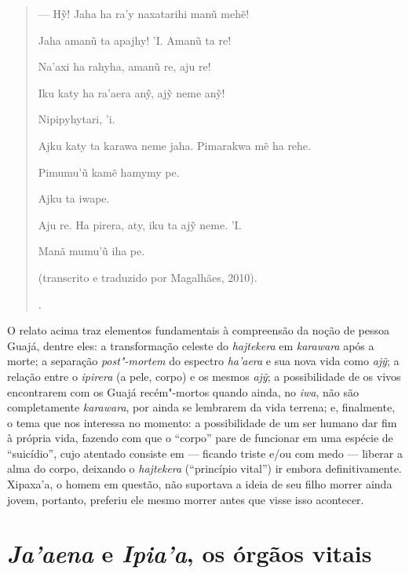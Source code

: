 \begin{quote}
{  --- Hỹ! Jaha ha ra'y naxatarihi manũ mehẽ!

  Jaha amanũ ta apajhy! 'I. Amanũ ta re!

  Na'axi ha rahyha, amanũ re, aju re!

  Iku katy ha ra'aera anỹ, ajỹ neme anỹ!

  Nipipyhytari, 'i.

  Ajku katy ta karawa neme jaha. Pimarakwa mẽ ha rehe.

  Pimumu'ũ kamẽ hamymy pe.

  Ajku ta iwape.

  Aju re. Ha pirera, aty, iku ta ajỹ neme. 'I.

  Manã mumu'ũ iha pe.

  (transcrito e traduzido por Magalhães, 2010).}.
\end{quote}

O relato acima traz elementos fundamentais à compreensão da noção de
pessoa Guajá, dentre eles: a transformação celeste do \emph{hajtekera}
em \emph{karawara} após a morte; a separação \emph{post"-mortem} do
espectro \emph{ha'aera} e sua nova vida como \emph{ajỹ}; a relação entre
o \emph{ipirera} (a pele, corpo) e os mesmos \emph{ajỹ}; a possibilidade
de os vivos encontrarem com os Guajá recém"-mortos quando ainda, no
\emph{iwa}, não são completamente \emph{karawara}, por ainda se
lembrarem da vida terrena; e, finalmente, o tema que nos interessa no
momento: a possibilidade de um ser humano dar fim à própria vida,
fazendo com que o ``corpo'' pare de funcionar em uma espécie de
``suicídio'', cujo atentado consiste em --- ficando triste e/ou com medo ---
liberar a alma do corpo, deixando o \emph{hajtekera} (``princípio vital'')
ir embora definitivamente. Xipaxa'a, o homem em questão, não suportava a
ideia de seu filho morrer ainda jovem, portanto, preferiu ele mesmo
morrer antes que visse isso acontecer.

\section{\emph{Ja'aena} e \emph{Ipia'a}, os órgãos
vitais}\label{jaaena-e-ipiaa-os-uxf3rguxe3os-vitais}

